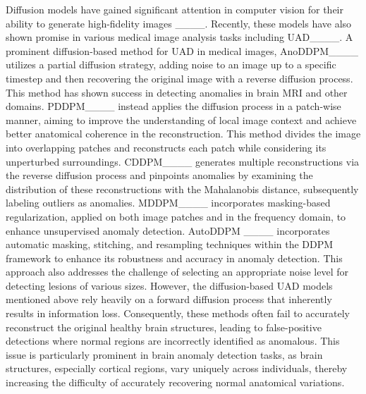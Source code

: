 Diffusion models have gained significant attention in computer vision for their ability to generate high-fidelity images ____. Recently, these models have also shown promise in various medical image analysis tasks including UAD____. A prominent diffusion-based method for UAD in medical images,  
AnoDDPM____ utilizes a partial diffusion strategy, adding noise to an image up to a specific timestep and then recovering the original image with a reverse diffusion process. This method has shown success in detecting anomalies in brain MRI and other domains.   PDDPM____ instead applies the diffusion process in a patch-wise manner, aiming to improve the understanding of local image context and achieve better anatomical coherence in the reconstruction. This method divides the image into overlapping patches and reconstructs each patch while considering its unperturbed surroundings. CDDPM____ generates multiple reconstructions via the reverse diffusion process and pinpoints anomalies by examining the distribution of these reconstructions with the Mahalanobis distance, subsequently labeling outliers as anomalies. MDDPM____ incorporates masking-based regularization, applied on both image patches and in the frequency domain, to enhance unsupervised anomaly detection. AutoDDPM ____ incorporates automatic masking, stitching, and resampling techniques within the DDPM framework to enhance its robustness and accuracy in anomaly detection. This approach also addresses the challenge of selecting an appropriate noise level for detecting lesions of various sizes. However, the diffusion-based UAD models mentioned above rely heavily on a forward diffusion process that inherently results in information loss. Consequently, these methods often fail to accurately reconstruct the original healthy brain structures, leading to false-positive detections where normal regions are incorrectly identified as anomalous. This issue is particularly prominent in brain anomaly detection tasks, as brain structures, especially cortical regions, vary uniquely across individuals, thereby increasing the difficulty of accurately recovering normal anatomical variations.

